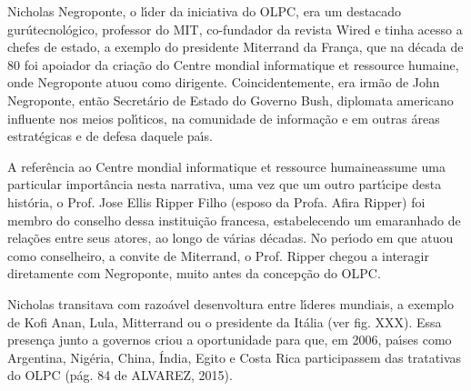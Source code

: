 \documentclass[
12pt,		%
openright,	%
twoside,  %
a4paper,			%
chapter=TITLE,		%
english,			%
french,				%
spanish,			%
brazil				%
]{USPSC-classe/USPSC}
\begin{document}
Nicholas Negroponte, o l\'{\i}der da iniciativa do OLPC, era um destacado \textquotedbl gur\'u\textquotedbl  tecnol\'ogico, professor do MIT, co-fundador da revista Wired e tinha acesso a chefes de estado, a exemplo do presidente Miterrand da Fran\c{c}a, que na d\'ecada de 80 foi apoiador da cria\c{c}\~ao do \textquotedbl Centre mondial informatique et ressource humaine\textquotedbl , onde Negroponte atuou como dirigente. Coincidentemente, era irm\~ao de John Negroponte, ent\~ao Secret\'ario de Estado do Governo Bush, diplomata americano influente nos meios pol\'{\i}ticos, na comunidade de informa\c{c}\~ao e em outras \'areas estrat\'egicas e de defesa daquele pa\'{\i}s.

















A refer\^encia ao \textquotedbl Centre mondial informatique et ressource humaine\textquotedbl  assume uma particular import\^ancia nesta narrativa, uma vez que um outro part\'{\i}cipe desta hist\'oria, o Prof. Jose Ellis Ripper Filho (esposo da Profa. Afira Ripper) foi membro do conselho dessa institui\c{c}\~ao francesa, estabelecendo um emaranhado de rela\c{c}\~oes entre seus atores, ao longo de v\'arias d\'ecadas. No per\'{\i}odo em que atuou como conselheiro, a convite de Miterrand, o Prof. Ripper chegou a interagir diretamente com Negroponte, muito antes da concep\c{c}\~ao do OLPC.

















Nicholas transitava com razo\'avel desenvoltura entre l\'{\i}deres mundiais, a exemplo de Kofi Anan, Lula, Mitterrand ou o presidente da It\'alia (ver fig. XXX). Essa presen\c{c}a junto a governos criou a oportunidade para que, em 2006, pa\'{\i}ses como Argentina, Nig\'eria, China, \'India, Egito e Costa Rica participassem das tratativas do OLPC  (p\'ag. 84 de ALVAREZ, 2015).
\end{document}
